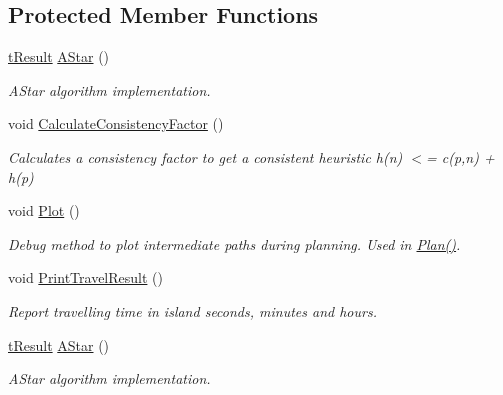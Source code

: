 \subsection*{Protected Member Functions}
\begin{DoxyCompactItemize}
\item 
\mbox{\hyperlink{structt_result}{t\+Result}} \mbox{\hyperlink{classplanner_1_1c_planner_a341e70531266f023ac9461d18979d1ef}{A\+Star}} ()
\begin{DoxyCompactList}\small\item\em A\+Star algorithm implementation. \end{DoxyCompactList}\item 
void \mbox{\hyperlink{classplanner_1_1c_planner_a2e5a745f83f903662eff914d8beddb5e}{Calculate\+Consistency\+Factor}} ()
\begin{DoxyCompactList}\small\item\em Calculates a consistency factor to get a consistent heuristic h(n) $<$= c(p,n) + h(p) \end{DoxyCompactList}\item 
\mbox{\label{classplanner_1_1c_planner_a236a68e02c7a99323f2d30b3097aa767}} 
void \mbox{\hyperlink{classplanner_1_1c_planner_a236a68e02c7a99323f2d30b3097aa767}{Plot}} ()
\begin{DoxyCompactList}\small\item\em Debug method to plot intermediate paths during planning. Used in \mbox{\hyperlink{classplanner_1_1c_planner_a21230c015260b9fc34ad2f239592470e}{Plan()}}. \end{DoxyCompactList}\item 
\mbox{\label{classplanner_1_1c_planner_ad8d82968444f958f1b7e7acdd9df2e64}} 
void \mbox{\hyperlink{classplanner_1_1c_planner_ad8d82968444f958f1b7e7acdd9df2e64}{Print\+Travel\+Result}} ()
\begin{DoxyCompactList}\small\item\em Report travelling time in island seconds, minutes and hours. \end{DoxyCompactList}\item 
\mbox{\hyperlink{structt_result}{t\+Result}} \mbox{\hyperlink{classplanner_1_1c_planner_a341e70531266f023ac9461d18979d1ef}{A\+Star}} ()
\begin{DoxyCompactList}\small\item\em A\+Star algorithm implementation. \end{DoxyCompactList}\item 

\end{DoxyCompactItemize}
